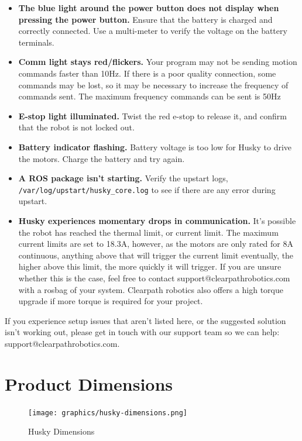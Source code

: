 \documentclass[]{clearpath-latex/clearpath-manual}
\begin{document}
\begin{itemize}
	\item \textbf{The blue light around the power button does not display when pressing the power button.} Ensure that the battery is charged and correctly connected. Use a multi-meter to verify the voltage on the battery terminals.
	\item \textbf{Comm light stays red/flickers.} Your program may not be sending motion commands faster than 10Hz. If there is a poor quality connection, some commands may be lost, so it may be necessary to increase the frequency of commands sent. The maximum frequency commands can be sent is 50Hz
	\item \textbf{E-stop light illuminated.} Twist the red e-stop to release it, and confirm that the robot is not locked out.
	\item \textbf{Battery indicator flashing.} Battery voltage is too low for Husky to drive the motors. Charge the battery and try again.
	\item \textbf{A ROS package isn't starting.} Verify the upstart logs, \lstinline{/var/log/upstart/husky_core.log} to see if there are any error during upstart.
	\item \textbf{Husky experiences momentary drops in communication.} It's possible the robot has reached the thermal limit, or current limit. The maximum current limits are set to 18.3A, however, as  the motors are only rated for 8A continuous, anything above that will trigger the current limit eventually, the higher above this limit, the more quickly it will trigger.  If you are unsure whether this is the case, feel free to contact support@clearpathrobotics.com with a rosbag of your system. Clearpath robotics also offers a high torque upgrade if more torque is required for your project.
\end{itemize}

If you experience setup issues that aren’t listed here, or the suggested solution isn’t working out, please get in touch with our support team so we can help: support@clearpathrobotics.com.

\newpage
\section{Product Dimensions}

\begin{figure}[h]
	\centering
	\texttt{[image: graphics/husky-dimensions.png]}
	\caption{Husky Dimensions}
\end{figure}
\newpage
\end{document}
